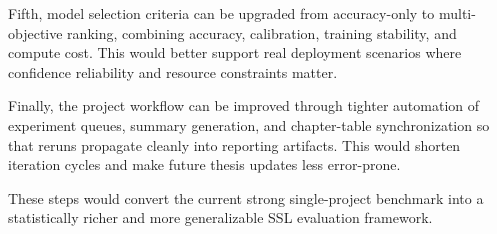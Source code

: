 Fifth, model selection criteria can be upgraded from accuracy-only to multi-objective ranking, combining accuracy, calibration, training stability, and compute cost. This would better support real deployment scenarios where confidence reliability and resource constraints matter.

Finally, the project workflow can be improved through tighter automation of experiment queues, summary generation, and chapter-table synchronization so that reruns propagate cleanly into reporting artifacts. This would shorten iteration cycles and make future thesis updates less error-prone.

These steps would convert the current strong single-project benchmark into a statistically richer and more generalizable SSL evaluation framework.